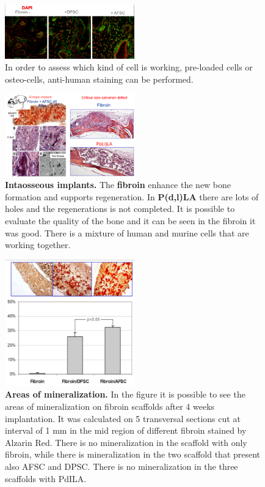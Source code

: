         \begin{figure}[H]
            \centering
            \includegraphics[width=0.5\textwidth]{fibroin_confocal.png}
            \caption{\label{fig:fibroin_confocal} In order to assess which kind of cell is working, pre-loaded cells or osteo-cells, anti-human staining can be performed.}
        \end{figure}

        \begin{figure}[H]
            \centering
            \includegraphics[width=0.5\textwidth]{intraosseous_implants.png}
            \caption{\label{fig:intraosseous_implants} \textbf{Intaosseous implants.} The \textbf{fibroin} enhance the new bone formation and supports regeneration. In \textbf{P(d,l)LA} there are lots of holes and the regenerations is not completed. It is possible to evaluate the quality of the bone and it can be seen in the fibroin it was good. There is a mixture of human and murine cells that are working together.}
        \end{figure}

        \begin{figure}[H]
            \centering
            \includegraphics[width=0.5\textwidth]{mineralization.png}
            \caption{\label{fig:mineralization} \textbf{Areas of mineralization.} In the figure it is possible to see the areas of mineralization on fibroin scaffolds after 4 weeks implantation. It was calculated on 5 transversal sections cut at interval of 1 mm in the mid region of different fibroin stained by Alzarin Red. There is no mineralization in the scaffold with only fibroin, while there is mineralization in the two scaffold that present also AFSC and DPSC. There is no mineralization in the three scaffolds with PdILA.}
        \end{figure}


